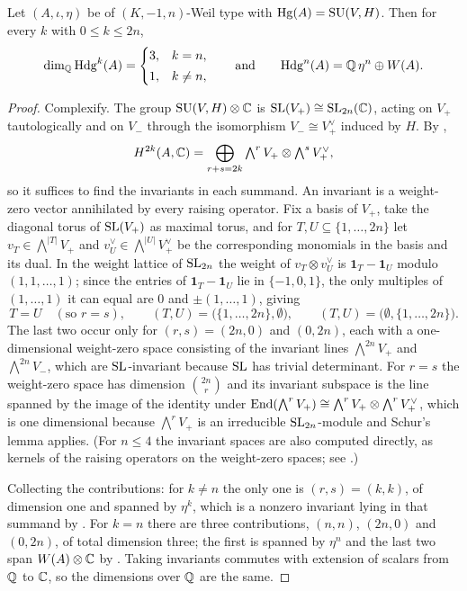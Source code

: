 \begin{theorem}\label{thm:hdgcount}
Let $(A,\iota,\eta)$ be of $(K,-1,n)$-Weil type with
$\operatorname{Hg}(A)=\operatorname{SU}(V,H)$. Then for every $k$ with $0\le k\le 2n$,
\[
  \dim_{\mathbb{Q}}\mathrm{Hdg}^{k}(A)=
  \begin{cases}
    3, & k=n,\\[2pt]
    1, & k\ne n,
  \end{cases}
  \qquad\text{and}\qquad
  \mathrm{Hdg}^{n}(A)=\mathbb{Q}\,\eta^{n}\oplus W(A).
\]
\end{theorem}

\begin{proof}
Complexify. The group $\operatorname{SU}(V,H)\otimes\mathbb{C}$ is $\operatorname{SL}(V_{+})\cong\operatorname{SL}_{2n}(\mathbb{C})$,
acting on $V_{+}$ tautologically and on $V_{-}$ through the isomorphism
$V_{-}\cong V_{+}^{\vee}$ induced by $H$. By ,
\[
  H^{2k}(A,\mathbb{C})=\bigoplus_{r+s=2k}
    \textstyle\bigwedge^{r}V_{+}\otimes\bigwedge^{s}V_{+}^{\vee},
\]
so it suffices to find the invariants in each summand. An invariant is a
weight-zero vector annihilated by every raising operator. Fix a basis of
$V_{+}$, take the diagonal torus of $\operatorname{SL}(V_{+})$ as maximal torus, and for
$T,U\subseteq\{1,\dots,2n\}$ let $v_{T}\in\bigwedge^{|T|}V_{+}$ and
$v_{U}^{\vee}\in\bigwedge^{|U|}V_{+}^{\vee}$ be the corresponding monomials in
the basis and its dual. In the weight lattice of $\operatorname{SL}_{2n}$ the weight of
$v_{T}\otimes v_{U}^{\vee}$ is
$\mathbf{1}_{T}-\mathbf{1}_{U}$ modulo $(1,1,\dots,1)$; since the entries of
$\mathbf{1}_{T}-\mathbf{1}_{U}$ lie in $\{-1,0,1\}$, the only multiples of
$(1,\dots,1)$ it can equal are $0$ and $\pm(1,\dots,1)$, giving
\[
  T=U \quad(\text{so } r=s),
  \qquad
  (T,U)=\bigl(\{1,\dots,2n\},\emptyset\bigr),
  \qquad
  (T,U)=\bigl(\emptyset,\{1,\dots,2n\}\bigr).
\]
The last two occur only for $(r,s)=(2n,0)$ and $(0,2n)$, each with a
one-dimensional weight-zero space consisting of the invariant lines
$\bigwedge^{2n}V_{+}$ and $\bigwedge^{2n}V_{-}$, which are $\operatorname{SL}$-invariant
because $\operatorname{SL}$ has trivial determinant. For $r=s$ the weight-zero space has
dimension $\binom{2n}{r}$ and its invariant subspace is the line spanned by the
image of the identity under
$\operatorname{End}(\bigwedge^{r}V_{+})\cong\bigwedge^{r}V_{+}\otimes\bigwedge^{r}V_{+}^{\vee}$,
which is one dimensional because $\bigwedge^{r}V_{+}$ is an irreducible
$\operatorname{SL}_{2n}$-module and Schur's lemma applies. (For $n\le4$ the invariant
spaces are also computed directly, as kernels of the raising operators on the
weight-zero spaces; see \cite{BMB26}.)

Collecting the contributions: for $k\ne n$ the only one is $(r,s)=(k,k)$, of
dimension one and spanned by $\eta^{k}$, which is a nonzero invariant lying in
that summand by . For $k=n$ there are three contributions,
$(n,n)$, $(2n,0)$ and $(0,2n)$, of total dimension three; the first is spanned
by $\eta^{n}$ and the last two span $W(A)\otimes\mathbb{C}$ by .
Taking invariants commutes with extension of scalars from $\mathbb{Q}$ to $\mathbb{C}$, so
the dimensions over $\mathbb{Q}$ are the same.
\end{proof}


